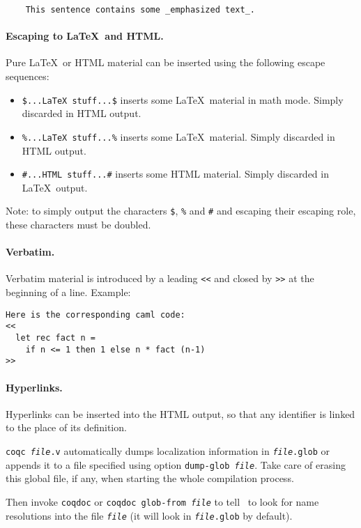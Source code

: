 \begin{verbatim}
    This sentence contains some _emphasized text_.
\end{verbatim}

\paragraph{Escaping to \LaTeX\ and HTML.}
Pure \LaTeX\ or HTML material can be inserted using the following
escape sequences:
\begin{itemize}
\item \verb+$...LaTeX stuff...$+ inserts some \LaTeX\ material in math mode.
  Simply discarded in HTML output.

\item \verb+%...LaTeX stuff...%+ inserts some \LaTeX\ material.
  Simply discarded in HTML output.

\item \verb+#...HTML stuff...#+ inserts some HTML material. Simply
  discarded in \LaTeX\ output.
\end{itemize}

Note: to simply output the characters \verb+$+, \verb+%+ and \verb+#+
and escaping their escaping role, these characters must be doubled.

\paragraph{Verbatim.}
Verbatim material is introduced by a leading \verb+<<+ and closed by
\verb+>>+ at the beginning of a line. Example:
\begin{verbatim}
Here is the corresponding caml code:
<<
  let rec fact n =
    if n <= 1 then 1 else n * fact (n-1)
>>
\end{verbatim}


\paragraph{Hyperlinks.}
Hyperlinks can be inserted into the HTML output, so that any
identifier is linked to the place of its definition.

\texttt{coqc \emph{file}.v} automatically dumps localization information
in \texttt{\emph{file}.glob} or appends it to a file specified using option
\texttt{\mm{}dump-glob \emph{file}}. Take care of erasing this global file, if
any, when starting the whole compilation process.

Then invoke \texttt{coqdoc} or \texttt{coqdoc \mm{}glob-from \emph{file}} to tell
\coqdoc\ to look for name resolutions into the file \texttt{\emph{file}}
(it will look in \texttt{\emph{file}.glob} by default).


